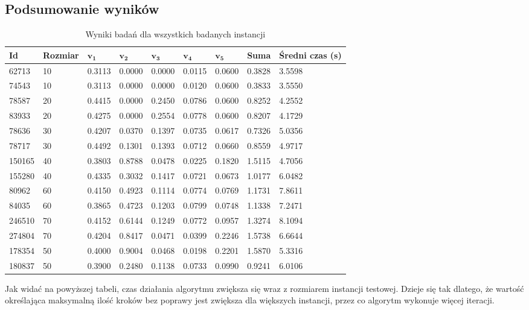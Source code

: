 \subsection{Podsumowanie wyników}
\begin{table}[H]
\centering
\begin{tabularx}{1\textwidth}{ | X | X | l | l | l | l | l | l | X | }
\hline
\bfseries Id & \bfseries Rozmiar & $\mathbf{v_1}$ & $\mathbf{v_2}$ & $\mathbf{v_3}$ & $\mathbf{v_4}$ & $\mathbf{v_5}$ & \bfseries Suma & \bfseries Średni czas (s) \\
\hline
62713 & 10 & 0.3113 & 0.0000 & 0.0000 & 0.0115 & 0.0600 & 0.3828 & 3.5598 \\
\hline
74543 & 10 & 0.3113 & 0.0000 & 0.0000 & 0.0120 & 0.0600 & 0.3833 & 3.5550 \\
\hline
78587 & 20 & 0.4415 & 0.0000 & 0.2450 & 0.0786 & 0.0600 & 0.8252 & 4.2552 \\
\hline
83933 & 20 & 0.4275 & 0.0000 & 0.2554 & 0.0778 & 0.0600 & 0.8207 & 4.1729 \\
\hline
78636 & 30 & 0.4207 & 0.0370 & 0.1397 & 0.0735 & 0.0617 & 0.7326 & 5.0356 \\
\hline
78717 & 30 & 0.4492 & 0.1301 & 0.1393 & 0.0712 & 0.0660 & 0.8559 & 4.9717 \\
\hline
150165 & 40 & 0.3803 & 0.8788 & 0.0478 & 0.0225 & 0.1820 & 1.5115 & 4.7056 \\
\hline
155280 & 40 & 0.4335 & 0.3032 & 0.1417 & 0.0721 & 0.0673 & 1.0177 & 6.0482 \\
\hline
80962 & 60 & 0.4150 & 0.4923 & 0.1114 & 0.0774 & 0.0769 & 1.1731 & 7.8611 \\
\hline
84035 & 60 & 0.3865 & 0.4723 & 0.1203 & 0.0799 & 0.0748 & 1.1338 & 7.2471 \\
\hline
246510 & 70 & 0.4152 & 0.6144 & 0.1249 & 0.0772 & 0.0957 & 1.3274 & 8.1094 \\
\hline
274804 & 70 & 0.4204 & 0.8417 & 0.0471 & 0.0399 & 0.2246 & 1.5738 & 6.6644 \\
\hline
178354 & 50 & 0.4000 & 0.9004 & 0.0468 & 0.0198 & 0.2201 & 1.5870 & 5.3316 \\
\hline
180837 & 50 & 0.3900 & 0.2480 & 0.1138 & 0.0733 & 0.0990 & 0.9241 & 6.0106 \\
\hline
\end{tabularx}
\caption{Wyniki badań dla wszystkich badanych instancji}
\end{table}
Jak widać na powyższej tabeli, czas działania algorytmu zwiększa się wraz z
rozmiarem instancji testowej. Dzieje się tak dlatego, że wartość określająca
maksymalną ilość kroków bez poprawy jest zwiększa dla większych instancji, przez
co algorytm wykonuje więcej iteracji.
